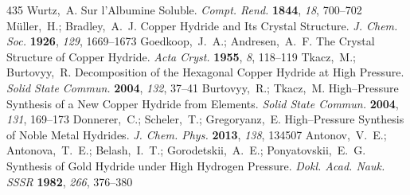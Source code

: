 \documentclass[12pt,letterpaper,oneside]{article}
\begin{document}
\begin{mcitethebibliography}{435}
\EndOfBibitem
{}
Wurtz,~A. Sur l'Albumine Soluble. \emph{Compt. Rend.} \textbf{1844}, \emph{18},
  700--702\relax
\mciteBstWouldAddEndPuncttrue
\mciteSetBstMidEndSepPunct{\mcitedefaultmidpunct}
{\mcitedefaultendpunct}{\mcitedefaultseppunct}\relax
\EndOfBibitem
{}
M{\"u}ller,~H.; Bradley,~A.~J. Copper Hydride and Its Crystal Structure.
  \emph{J. Chem. Soc.} \textbf{1926}, \emph{129}, 1669--1673\relax
\mciteBstWouldAddEndPuncttrue
\mciteSetBstMidEndSepPunct{\mcitedefaultmidpunct}
{\mcitedefaultendpunct}{\mcitedefaultseppunct}\relax
\EndOfBibitem
{}
Goedkoop,~J.~A.; Andresen,~A.~F. The Crystal Structure of Copper Hydride.
  \emph{Acta Cryst.} \textbf{1955}, \emph{8}, 118--119\relax
\mciteBstWouldAddEndPuncttrue
\mciteSetBstMidEndSepPunct{\mcitedefaultmidpunct}
{\mcitedefaultendpunct}{\mcitedefaultseppunct}\relax
\EndOfBibitem
{}
Tkacz,~M.; Burtovyy,~R. Decomposition of the Hexagonal Copper Hydride at High
  Pressure. \emph{Solid State Commun.} \textbf{2004}, \emph{132}, 37--41\relax
\mciteBstWouldAddEndPuncttrue
\mciteSetBstMidEndSepPunct{\mcitedefaultmidpunct}
{\mcitedefaultendpunct}{\mcitedefaultseppunct}\relax
\EndOfBibitem
{}
Burtovyy,~R.; Tkacz,~M. High--Pressure Synthesis of a New Copper Hydride from
  Elements. \emph{Solid State Commun.} \textbf{2004}, \emph{131},
  169--173\relax
\mciteBstWouldAddEndPuncttrue
\mciteSetBstMidEndSepPunct{\mcitedefaultmidpunct}
{\mcitedefaultendpunct}{\mcitedefaultseppunct}\relax
\EndOfBibitem
{}
Donnerer,~C.; Scheler,~T.; Gregoryanz,~E. High--Pressure Synthesis of Noble
  Metal Hydrides. \emph{J. Chem. Phys.} \textbf{2013}, \emph{138}, 134507\relax
\mciteBstWouldAddEndPuncttrue
\mciteSetBstMidEndSepPunct{\mcitedefaultmidpunct}
{\mcitedefaultendpunct}{\mcitedefaultseppunct}\relax
\EndOfBibitem
{}
Antonov,~V.~E.; Antonova,~T.~E.; Belash,~I.~T.; Gorodetskii,~A.~E.;
  Ponyatovskii,~E.~G. Synthesis of Gold Hydride under High Hydrogen Pressure.
  \emph{Dokl. Acad. Nauk. SSSR} \textbf{1982}, \emph{266}, 376--380\relax
\mciteBstWouldAddEndPuncttrue
\mciteSetBstMidEndSepPunct{\mcitedefaultmidpunct}
{\mcitedefaultendpunct}{\mcitedefaultseppunct}\relax

\end{mcitethebibliography}
\end{document}
